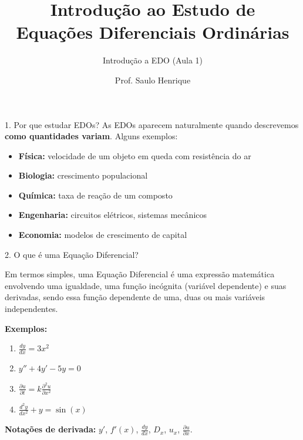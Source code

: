 \documentclass[11pt, aspectratio=169, xcolor=table]{beamer}
\title{Introdução ao Estudo de\\[4pt] Equações Diferenciais Ordinárias}
\subtitle{Introdução a EDO (Aula 1)}
\author{Prof. Saulo Henrique}
\begin{document}
\slidetitulo

\begin{frame}{1. Por que estudar EDOs?}
As EDOs aparecem naturalmente quando descrevemos \textbf{como quantidades variam}. Alguns exemplos:
\begin{itemize}
  \item \textbf{Física:} velocidade de um objeto em queda com resistência do ar
  \item \textbf{Biologia:} crescimento populacional
  \item \textbf{Química:} taxa de reação de um composto
  \item \textbf{Engenharia:} circuitos elétricos, sistemas mecânicos
  \item \textbf{Economia:} modelos de crescimento de capital
\end{itemize}
\end{frame}


\begin{frame}{2. O que é uma Equação Diferencial?}

Em termos simples, uma Equação Diferencial é uma expressão matemática envolvendo uma igualdade, uma função incógnita (variável dependente) e suas derivadas, sendo essa função dependente de uma, duas ou mais variáveis independentes.

\textbf{Exemplos:}

\begin{enumerate}
    \item $ \frac{dy}{dx}=3x^2 $

    \item $ y''+4y'-5y=0 $

    \item $ \frac{\partial u}{\partial t}=k\frac{\partial^2u}{\partial x^2} $

    \item $ \frac{d^2y}{dx^2}+y=\sin(x) $
\end{enumerate}

\vspace{0.2cm}

\textbf{Notações de derivada:} 
$y'$, $f'(x)$, $\frac{dy}{dx}$, $D_x$, $u_x$, $\frac{\partial u}{\partial x}$.

\end{frame}
\end{document}
